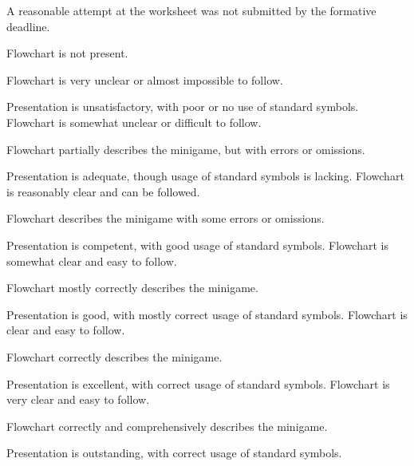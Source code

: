\documentclass{../../../fal_assignment}
\begin{document}
\begin{markingrubric}
		\grade\fail	A reasonable attempt at the worksheet was not submitted by the formative deadline.
		
        \grade\fail Flowchart is not present.
			\par Flowchart is very unclear or almost impossible to follow.
			\par Presentation is unsatisfactory, with poor or no use of standard symbols.
        \grade Flowchart is somewhat unclear or difficult to follow.
			\par Flowchart partially describes the minigame, but with errors or omissions.
			\par Presentation is adequate, though usage of standard symbols is lacking.
        \grade Flowchart is reasonably clear and can be followed.
			\par Flowchart describes the minigame with some errors or omissions.
			\par Presentation is competent, with good usage of standard symbols.
        \grade Flowchart is somewhat clear and easy to follow.
			\par Flowchart mostly correctly describes the minigame.
			\par Presentation is good, with mostly correct usage of standard symbols.
        \grade Flowchart is clear and easy to follow.
			\par Flowchart correctly describes the minigame.
			\par Presentation is excellent, with correct usage of standard symbols.
        \grade Flowchart is very clear and easy to follow.
			\par Flowchart correctly and comprehensively describes the minigame.
			\par Presentation is outstanding, with correct usage of standard symbols.


\end{markingrubric}
\end{document}
